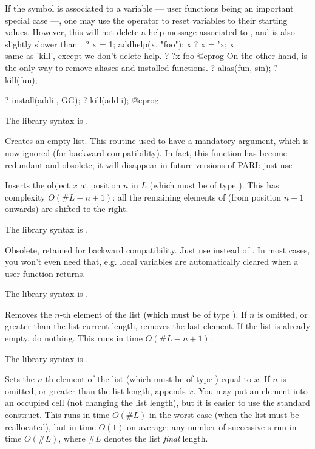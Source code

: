 If the symbol is associated to a variable --- user functions being an
important special case ---, one may use the  operator
 to reset variables to their starting values. However, this
will not delete a help message associated to , and is also slightly
slower than .
\bprog
? x = 1; addhelp(x, "foo"); x
? x = 'x; x   \\ same as 'kill', except we don't delete help.
? ?x
foo
@eprog\noindent
On the other hand,  is the only way to remove aliases and installed
functions.
\bprog
? alias(fun, sin);
? kill(fun);

? install(addii, GG);
? kill(addii);
@eprog

The library syntax is .

\label{se:listcreate}
Creates an empty list. This routine used to have a mandatory argument,
which is now ignored (for backward compatibility). In fact, this function
has become redundant and obsolete; it will disappear in future versions of
PARI: just use 

\label{se:listinsert}
Inserts the object $x$ at
position $n$ in $L$ (which must be of type ). This has
complexity $O(\#L - n + 1)$: all the
remaining elements of  (from position $n+1$ onwards) are shifted
to the right.

The library syntax is .

\label{se:listkill}
Obsolete, retained for backward compatibility. Just use 
instead of . In most cases, you won't even need that, e.g.
local variables are automatically cleared when a user function returns.

The library syntax is .

\label{se:listpop}
Removes the $n$-th element of the list
 (which must be of type ). If $n$ is omitted,
or greater than the list current length, removes the last element.
If the list is already empty, do nothing. This runs in time $O(\#L - n + 1)$.

The library syntax is .

\label{se:listput}
Sets the $n$-th element of the list
 (which must be of type ) equal to $x$. If $n$ is omitted,
or greater than the list length, appends $x$.
You may put an element into an occupied cell (not changing the
list length), but it is easier to use the standard 
construct. This runs in time $O(\#L)$ in the worst case (when the list must
be reallocated), but in time $O(1)$ on average: any number of successive
s run in time $O(\#L)$, where $\#L$ denotes the list
\emph{final} length.

